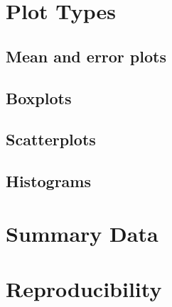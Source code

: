 \documentclass{article}
\begin{document}
\section{Plot Types}
\subsection{Mean and error plots} 


\subsection{Boxplots}


\subsection{Scatterplots}


\subsection{Histograms}



\section{Summary Data}



\section{Reproducibility}
\end{document}
